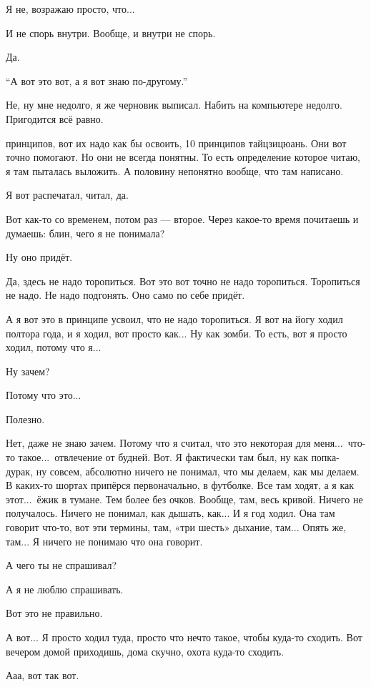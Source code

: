 \I
Я не, возражаю просто, что...

\M
И не спорь внутри. Вообще, и внутри не спорь.

\I
Да.

\M
``А вот это вот, а я вот знаю по-другому.''

\I
Не, ну мне недолго, я же черновик выписал.
Набить на компьютере недолго. Пригодится всё равно.

 принципов, вот их надо как бы освоить, 10 принципов тайцзицюань. Они вот точно помогают.
Но они не всегда понятны. То есть определение которое
читаю, я там пыталась выложить. А половину непонятно
вообще, что там написано.

\I
Я вот распечатал, читал, да.

\M
Вот как-то со временем, потом раз --- второе. Через какое-то время почитаешь и думаешь:
блин, чего я не понимала?

\I
Ну оно придёт.

\M
Да, здесь не надо торопиться.
Вот это вот точно не надо торопиться.
Торопиться не надо. Не надо подгонять.
Оно само по себе придёт.

\I
А я вот это в принципе усвоил, что не надо торопиться. Я вот на йогу ходил полтора года,
и я ходил, вот просто как... Ну как зомби. То есть, вот я
просто ходил, потому что я...

\M
Ну зачем?

\I
Потому что это...

\M
Полезно.

\I
Нет, даже не знаю зачем.
Потому что я считал, что это некоторая для меня...\ что-то такое...\ отвлечение от будней.
Вот. Я фактически там был, ну как попка-дурак, ну совсем,
абсолютно ничего не понимал, что мы делаем, как мы делаем.
В каких-то шортах припёрся первоначально, в футболке. Все там ходят, а я как этот...\ ёжик
в тумане.
Тем более без очков.
Вообще, там, весь кривой.
Ничего не получалось.
Ничего не понимал, как дышать, как... И я год ходил.
Она там говорит что-то, вот эти термины, там, «три шесть» дыхание, там...
Опять же, там...
Я ничего не понимаю что она говорит.

\M
А чего ты не спрашивал?

\I
А я не люблю спрашивать.

\M
Вот это не правильно.

\I
А вот...
Я просто ходил туда, просто что нечто такое, чтобы куда-то сходить.
Вот вечером домой приходишь, дома скучно, охота куда-то сходить.

\M
Ааа, вот так вот.

